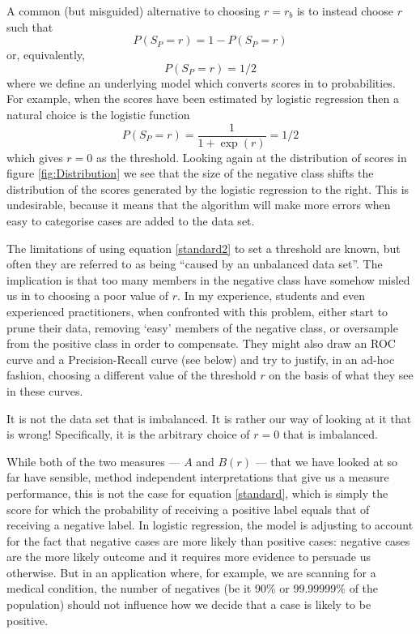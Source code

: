 \documentclass[preprint,12pt]{article}
\begin{document}
A common (but misguided) alternative to choosing $r=r_b$ is to instead choose $r$ such that
 \begin{equation}
P(S_P = r) = 1 - P(S_P=r) \label{standard}
\end{equation}
or, equivalently,
\begin{equation}
P(S_P = r) = 1/2 \label{standard2}
\end{equation}
where we define an underlying model which converts scores in to probabilities. For example, when the scores have been estimated by logistic regression then a natural choice is the logistic function
\[
P(S_P = r) = \frac{1}{1+\exp(r)} = 1/2
\] 
which gives $r=0$ as the threshold. Looking again at the distribution of scores in figure \ref{fig:Distribution}  we see that the size of the negative class shifts the distribution of the scores generated by the logistic regression to the right. This is undesirable, because it means that the algorithm will make more errors when easy to categorise cases are added to the data set.

The limitations of using equation \ref{standard2} to set a threshold are known, but often they are referred to as being ``caused by an unbalanced data set''. The implication is that too many members in the negative class have somehow misled us in to choosing a poor value of $r$. In my experience, students and even experienced practitioners, when confronted with this problem, either start to prune their data, removing `easy' members of the negative class, or oversample from the positive class in order to compensate. They might also draw an ROC curve and a Precision-Recall curve (see below) and try to justify, in an ad-hoc fashion, choosing a different value of the threshold $r$ on the basis of what they see in these curves.

It is not the data set that is imbalanced. It is rather our way of looking at it that is wrong! Specifically, it is the arbitrary choice of $r=0$ that is imbalanced. 

While both of the two measures --- $A$ and $B(r)$ --- that we have looked at so far have sensible, method independent interpretations that give us a measure performance, this is not the case for equation \ref{standard}, which is simply the score for which the probability of receiving a positive label equals that of receiving a negative label. In logistic regression, the model is adjusting to account for the fact that negative cases are more likely than positive cases: negative cases are the more likely outcome and it requires more evidence to persuade us otherwise. But in an application where, for example, we are scanning for a medical condition, the number of negatives (be it 90\% or 99.99999\% of the population) should not influence how we decide that a case is likely to be positive. 
\end{document}
